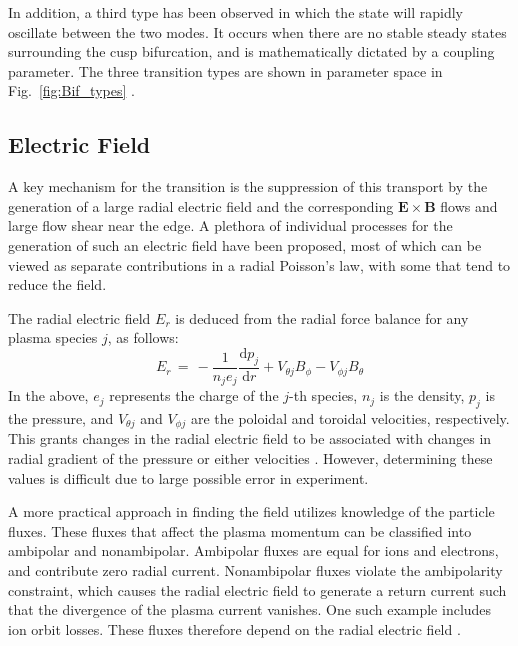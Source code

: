 \documentclass[a4paper]{article}
\begin{document}
In addition, a third type has been observed in which the state will rapidly oscillate between the two modes.
It occurs when there are no stable steady states surrounding the cusp bifurcation, and is mathematically dictated by a coupling parameter.
The three transition types are shown in parameter space in Fig.~\ref{fig:Bif_types}
\cite{weymiens_bifurcation_2014}.


\subsection{Electric Field}
A key mechanism for the transition is the suppression of this transport by the generation of a large radial electric field and the corresponding $\mathbf{E}\times\mathbf{B}$ flows and large flow shear near the edge.
A plethora of individual processes for the generation of such an electric field have been proposed, most of which can be viewed as separate contributions in a radial Poisson's law, with some that tend to reduce the field.

The radial electric field $E_r$ is deduced from the radial force balance for any plasma species $j$, as follows:
\begin{equation}
	E_r \,=\, -\frac{1}{n_j e_j} \frac{\text{d} p_j}{\text{d} r} + V_{\theta j} B_\phi - V_{\phi j} B_\theta
	\label{eq:E_r}
\end{equation}
In the above, $e_j$ represents the charge of the $j$-th species, $n_j$ is the density, $p_j$ is the pressure, and $V_{\theta j}$ and $V_{\phi j}$ are the poloidal and toroidal velocities, respectively.
This grants changes in the radial electric field to be associated with changes in radial gradient of the pressure or either velocities \cite{connor_review_2000}\cite{staps_backstepping_2017}.
However, determining these values is difficult due to large possible error in experiment.

A more practical approach in finding the field utilizes knowledge of the particle fluxes.
These fluxes that affect the plasma momentum can be classified into ambipolar and nonambipolar.
Ambipolar fluxes are equal for ions and electrons, and contribute zero radial current.
Nonambipolar fluxes violate the ambipolarity constraint, which causes the radial electric field to generate a return current such that the divergence of the plasma current vanishes.
One such example includes ion orbit losses.
These fluxes therefore depend on the radial electric field \cite{callen_toroidal_2009}.
\end{document}
